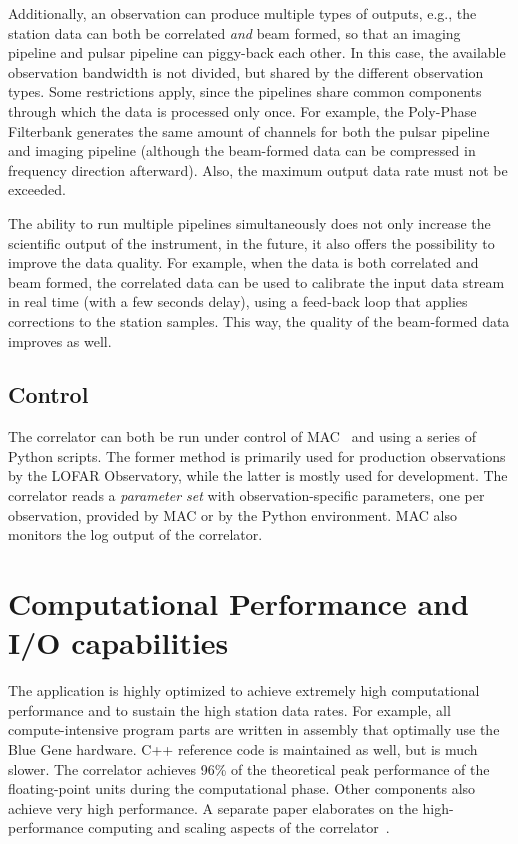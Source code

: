 Additionally, an observation can produce multiple types of outputs, e.g.,
the station data can both be correlated \emph{and\/} beam formed, so that
an imaging pipeline and pulsar pipeline can piggy-back each other.
In this case, the available observation bandwidth is not divided, but shared
by the different observation types.
Some restrictions apply, since the pipelines share common components through
which the data is processed only once.
For example, the Poly-Phase Filterbank generates the same amount of channels
for both the pulsar pipeline and imaging pipeline (although the beam-formed
data can be compressed in frequency direction afterward).
Also, the maximum output data rate must not be exceeded.

The ability to run multiple pipelines simultaneously does not only increase
the scientific output of the instrument, in the future, it also offers the
possibility to improve the data quality.
For example, when the data is both correlated and beam formed, the correlated
data can be used to calibrate the input data stream in real time (with a few
seconds delay), using a feed-back loop that applies corrections to the station
samples.
This way, the quality of the beam-formed data improves as well.


\subsection{Control}

The correlator can both be run under control of MAC~\cite{Overeem:10} and
using a series of Python scripts.
The former method is primarily used for production observations by the
LOFAR Observatory, while the latter is mostly used for development.
The correlator reads a \emph{parameter set\/} with observation-specific
parameters, one per observation, provided by MAC or by the Python environment.
MAC also monitors the log output of the correlator.


\section{Computational Performance and I/O capabilities}

The application is highly optimized to achieve extremely high computational
performance and to sustain the high station data rates.
For example, all compute-intensive program parts are written in assembly
that optimally use the Blue Gene hardware.
C++ reference code is maintained as well, but is much slower.
The correlator achieves 96\% of the theoretical peak performance
of the floating-point units during the computational phase.
Other components also achieve very high performance.
A separate paper elaborates on the high-performance computing and scaling
aspects of the correlator~\cite{Romein:10a}.

